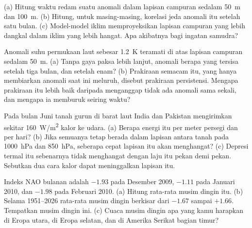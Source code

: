 \begin{exercise}[$\star\star$]\label{exo:b2:climate-variability:5}
(a) Hitung waktu redam suatu anomali dalam lapisan campuran sedalam \qty{50}{m} dan \qty{100}{m}.
(b) Hitung, untuk masing-masing, korelasi jeda anomali itu setelah satu bulan. (c) Model-model iklim
memproyeksikan lapisan campuran yang lebih dangkal dalam iklim yang lebih hangat. Apa akibatnya bagi ingatan
samudra?
\end{exercise}

\begin{exercise}[$\star\star$]\label{exo:b2:climate-variability:6}
Anomali suhu permukaan laut sebesar \qty{+1.2}{K} teramati di atas lapisan campuran sedalam \qty{50}{m}.
(a) Tanpa gaya paksa lebih lanjut, anomali berapa yang tersisa setelah tiga bulan, dan setelah enam? (b)
Prakiraan semacam itu, yang hanya membiarkan anomali saat ini meluruh, disebut prakiraan persistensi.
Mengapa prakiraan itu lebih baik daripada menganggap tidak ada anomali sama sekali, dan mengapa ia memburuk seiring waktu?
\end{exercise}

\begin{exercise}[$\star\star$]\label{exo:b2:climate-variability:7}
Pada bulan Juni tanah gurun di barat laut India dan Pakistan mengirimkan sekitar
\qty{160}{W/m^2} kalor ke udara. (a) Berapa energi itu per meter persegi dan per hari?
(b) Jika semuanya tetap berada dalam lapisan antara tanah pada \qty{1000}{hPa} dan \qty{850}{hPa}, seberapa
cepat lapisan itu akan menghangat? (c) Depresi termal itu sebenarnya tidak menghangat dengan laju itu pekan demi pekan.
Sebutkan dua cara kalor dapat meninggalkan lapisan itu.
\end{exercise}

\begin{exercise}[$\star\star$]\label{exo:b2:climate-variability:8}
Indeks NAO bulanan adalah $-1.93$ pada Desember 2009, $-1.11$ pada Januari 2010, dan $-1.98$ pada
Februari 2010. (a) Hitung rata-rata musim dingin itu. (b) Selama 1951--2026 rata-rata musim dingin berkisar dari
$-1.67$ sampai $+1.66$. Tempatkan musim dingin ini. (c) Cuaca musim dingin apa yang kamu harapkan di Eropa
utara, di Eropa selatan, dan di Amerika Serikat bagian timur?
\end{exercise}

